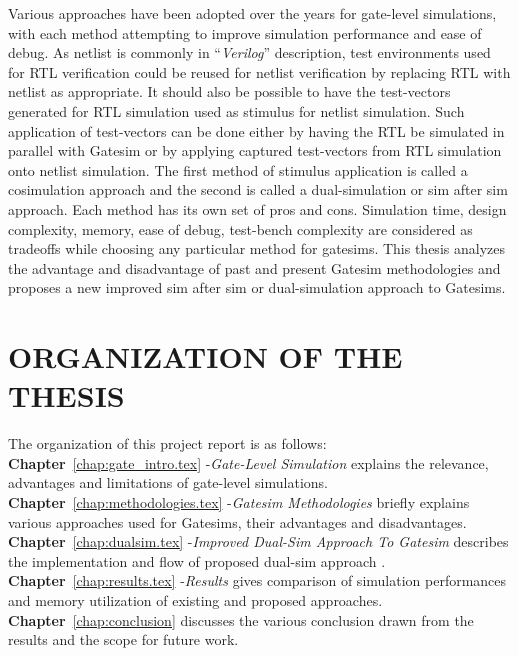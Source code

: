 Various approaches have been adopted over the years for gate-level simulations, with each method attempting to improve simulation performance and ease of debug. As netlist is commonly in ``{\it Verilog}'' description, test environments used for RTL verification could be reused for netlist verification by replacing RTL with netlist as appropriate. It should also be possible to have the test-vectors generated for RTL simulation used as stimulus for netlist simulation. Such application of test-vectors can be done either by having the RTL be simulated in parallel with Gatesim or by applying captured test-vectors from RTL simulation onto netlist simulation. The first method of stimulus application is called a cosimulation approach and the second is called a dual-simulation or sim after sim approach. Each method has its own set of pros and cons. Simulation time, design complexity, memory, ease of debug, test-bench complexity are considered as tradeoffs while choosing any particular method for gatesims. This thesis analyzes the advantage and disadvantage of past and present Gatesim methodologies and  proposes a new improved sim after sim or dual-simulation approach to Gatesims. 



\section{ORGANIZATION OF THE THESIS}
The organization of this project report is as follows:\\
\noindent 
{\bf Chapter}~\ref{chap:gate_intro.tex} -{\it Gate-Level Simulation} explains the relevance, advantages and limitations of gate-level simulations.\\
{\bf Chapter}~\ref{chap:methodologies.tex} -{\it Gatesim Methodologies} briefly explains various approaches used for Gatesims, their advantages and disadvantages.\\
{\bf Chapter}~\ref{chap:dualsim.tex} -{\it Improved Dual-Sim Approach To Gatesim} describes the implementation and flow of proposed dual-sim approach .\\
{\bf Chapter}~\ref{chap:results.tex} -{\it Results} gives comparison of simulation performances and memory utilization of existing and proposed approaches.\\
{\bf Chapter}~\ref{chap:conclusion} discusses the various conclusion drawn from the results and the scope for future work.
